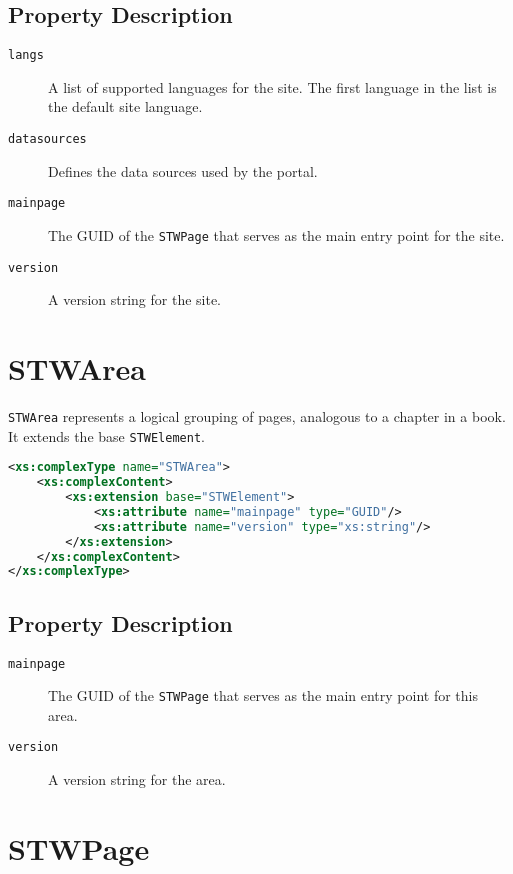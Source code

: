 \subsection{Property Description}

\begin{description}
\item[\texttt{langs}] A list of supported languages for the site. The first language in the list is the default site language.
\item[\texttt{datasources}] Defines the data sources used by the portal.
\item[\texttt{mainpage}] The GUID of the \texttt{STWPage} that serves as the main entry point for the site.
\item[\texttt{version}] A version string for the site.
\end{description}

\section{STWArea}

\texttt{STWArea} represents a logical grouping of pages, analogous to a chapter in a book. It extends the base \texttt{STWElement}.

\begin{lstlisting}[language=XML,caption={STWArea XSD Definition}]
<xs:complexType name="STWArea">
    <xs:complexContent>
        <xs:extension base="STWElement">
            <xs:attribute name="mainpage" type="GUID"/>
            <xs:attribute name="version" type="xs:string"/>
        </xs:extension>
    </xs:complexContent>
</xs:complexType>
\end{lstlisting}

\subsection{Property Description}

\begin{description}
\item[\texttt{mainpage}] The GUID of the \texttt{STWPage} that serves as the main entry point for this area.
\item[\texttt{version}] A version string for the area.
\end{description}

\section{STWPage}

